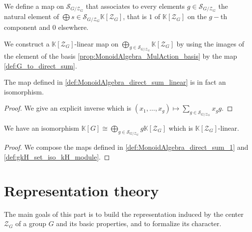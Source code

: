 \begin{definition}
    \label{def:G_to_direct_sum}
    \leanok
    We define a map on $\mathcal{S}_{G/\mathcal{Z}_G}$ that associates to every elements
    $g\in\mathcal{S}_{G/\mathcal{Z}_G}$ the natural element of $\bigoplus\limits{s\in\mathcal{S}_{G/\mathcal{Z}_G}}\mathbb{K}[\mathcal{Z}_G]$,
    that is $1$ of $\mathbb{K}[\mathcal{Z}_G]$ on the $g-$th component and 0 elsewhere.
\end{definition}


\begin{definition}
    \label{def:MonoidAlgebra_direct_sum_linear}
    \leanok
    We construct a $\mathbb{K}[\mathcal{Z}_G]$-linear map on $\bigoplus\limits_{g\in\mathcal{S}_{G/\mathcal{Z}_G}}\mathbb{K}[\mathcal{Z}_G]$
    by using the images of the element of the basis \ref{prop:MonoidAlgebra_MulAction_basis} by the map \ref{def:G_to_direct_sum}.
\end{definition}

\begin{definition}
    \label{def:MonoidAlgebra_direct_sum_1}
    \leanok
    The map defined in \ref{def:MonoidAlgebra_direct_sum_linear} is in fact an isomorphism.
    \begin{proof}
        We give an explicit inverse which is $(x_1,\dots,x_g)\mapsto\sum\limits_{g\in\mathcal{S}_{G/\mathcal{Z}_G}} x_gg$.
    \end{proof}
\end{definition}

\begin{definition}
    \label{def:MonoidAlgebra_direct_sum_system_of_repr_center.set }
    \leanok
    We have an isomorphism $\mathbb{K}[G]\cong \bigoplus\limits_{g\in\mathcal{S}_{G/\mathcal{Z}_G}}g\mathbb{K}[\mathcal{Z}_G]$
    which is $\mathbb{K}[\mathcal{Z}_G]$-linear.
    \begin{proof}
        We compose the maps defined in \ref{def:MonoidAlgebra_direct_sum_1} and \ref{def:gkH_set_iso_kH_module}.
    \end{proof}
\end{definition}


\section{Representation theory}
The main goals of this part is to build the representation induced
by the center $\mathcal{Z}_G$ of a group $G$ and its basic properties, 
and to formalize its character.
\newline


